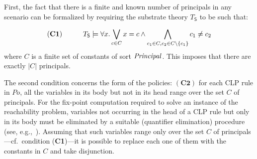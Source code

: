 \documentclass[conference]{llncs}
\newcommand{\principal}{\ensuremath \mathit{Principal}}
\begin{document}
First, 
the fact that there is a finite and known number of principals
in any scenario can be formalized by requiring the substrate theory
$T_{\mathsf{S}}$ to be such that: 

$$\text{(\textbf{C1})} \quad\quad\quad T_{\mathsf{S}}\models \forall x.\bigvee_{c\in C} x=c\wedge \bigwedge_{c_1\in C,c_2\in C\setminus\{c_1\}} c_1\neq c_2$$
where $C$ is a finite set of constants of sort $\principal$. 
This imposes that there are exactly $|C|$ principals. 

The second condition
concerns the form of the policies: $(\textbf{C2})$ {for each CLP rule in
$\mathit{Po}$, all the variables in its body but not in its head range
over the set $C$ of principals.} 
For the fix-point computation required to solve an instance of the
reachability problem, variables not occurring in the head of a CLP
rule but only in its body must be eliminated by a suitable (quantifier
elimination) procedure (see, e.g.,~\cite{constraintdatalog}).
Assuming that such variables range only over the set $C$ of
principals---cf.~condition (\textbf{C1})---it is possible to replace
each one of them with the constants in $C$ and take disjunction.
\end{document}
